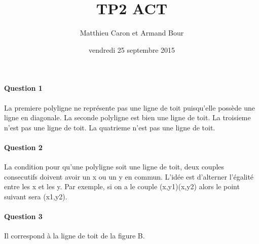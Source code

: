 \documentclass[a4paper,10pt]{article}
\title{TP2 ACT}
\author{Matthieu Caron et Armand Bour}
\date{vendredi 25 septembre 2015}
\begin{document}
\maketitle

\paragraph{Question 1}
La premiere polyligne ne représente pas une ligne de toit puisqu'elle possède une ligne en diagonale.\newline
La seconde polyligne est bien une ligne de toit.\newline
La troisieme n'est pas une ligne de toit.\newline
La quatrieme n'est pas une ligne de toit.\newline
\paragraph{Question 2}
La condition pour qu'une polyligne soit une ligne de toit, deux couples consecutifs doivent avoir un x ou un y en commun.
L'idée est d'alterner l'égalité entre les x et les y.
Par exemple, si on a le couple (x,y1)(x,y2) alors le point suivant sera (x1,y2). 
\paragraph{Question 3}
Il correspond à la ligne de toit de la figure B.
\end{document}
